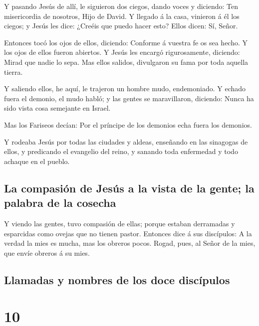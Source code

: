  Y pasando Jesús de allí, le siguieron dos ciegos, dando
voces y diciendo: Ten misericordia de nosotros, Hijo de David.
 Y llegado á la casa, vinieron á él los ciegos; y Jesús les
dice: ¿Creéis que puedo hacer esto? Ellos dicen: Sí, Señor.

 Entonces tocó los ojos de ellos, diciendo: Conforme á
vuestra fe os sea hecho.  Y los ojos de ellos fueron
abiertos. Y Jesús les encargó rigurosamente, diciendo: Mirad que nadie
lo sepa.  Mas ellos salidos, divulgaron su fama por toda
aquella tierra.

 Y saliendo ellos, he aquí, le trajeron un hombre mudo,
endemoniado.  Y echado fuera el demonio, el mudo habló; y
las gentes se maravillaron, diciendo: Nunca ha sido vista cosa semejante
en Israel.

 Mas los Fariseos decían: Por el príncipe de los demonios
echa fuera los demonios.

 Y rodeaba Jesús por todas las ciudades y aldeas, enseñando
en las sinagogas de ellos, y predicando el evangelio del reino, y
sanando toda enfermedad y todo achaque en el pueblo.

\hypertarget{la-compasiuxf3n-de-jesuxfas-a-la-vista-de-la-gente-la-palabra-de-la-cosecha}{%
\subsection{La compasión de Jesús a la vista de la gente; la palabra de
la
cosecha}\label{la-compasiuxf3n-de-jesuxfas-a-la-vista-de-la-gente-la-palabra-de-la-cosecha}}

 Y viendo las gentes, tuvo compasión de ellas; porque
estaban derramadas y esparcidas como ovejas que no tienen pastor.
 Entonces dice á sus discípulos: A la verdad la mies es
mucha, mas los obreros pocos.  Rogad, pues, al Señor de la
mies, que envíe obreros á su mies.

\hypertarget{llamadas-y-nombres-de-los-doce-discuxedpulos}{%
\subsection{Llamadas y nombres de los doce
discípulos}\label{llamadas-y-nombres-de-los-doce-discuxedpulos}}

\hypertarget{section-9}{%
\section{10}\label{section-9}}

